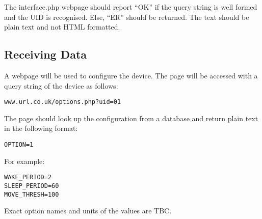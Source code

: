 \documentclass[12pt]{article}
\begin{document}
The interface.php webpage should report ``OK'' if the query string is well formed and the UID is recognised. 
Else, ``ER'' should be returned. 
The text should be plain text and not HTML formatted.

\subsection{Receiving Data}

A webpage will be used to configure the device.
The page will be accessed with a query string of the device as follows:

\begin{lstlisting}
www.url.co.uk/options.php?uid=01
\end{lstlisting}

The page should look up the configuration from a database and return plain text in the following format:

\begin{lstlisting}
OPTION=1
\end{lstlisting}
For example:

\begin{lstlisting}
WAKE_PERIOD=2
SLEEP_PERIOD=60
MOVE_THRESH=100
\end{lstlisting}

Exact option names and units of the values are TBC. 
\end{document}
